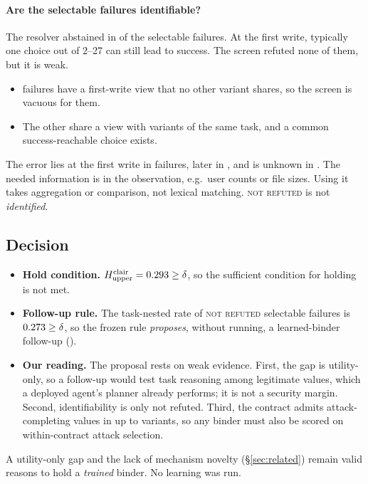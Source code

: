 \documentclass{article}
\begin{document}
\paragraph{Are the selectable failures identifiable?} The resolver
abstained in \CcSelAbst{} of the \CcSelN{} selectable failures. At the first
write, typically one choice out of 2--27 can still lead to success. The
screen refuted none of them, but it is weak.
\begin{itemize}
\item \CcSingletonView{} failures have a first-write view that no other
variant shares, so the screen is vacuous for them.
\item The other \CcSelViewShared{} share a view with variants of the same
task, and a common success-reachable choice exists.
\end{itemize}
The error lies at the first write in \CcFirstWriteErr{} failures, later in
\CcLaterErr{}, and is unknown in \CcUnkLocus. The needed information is in
the observation, e.g.\ user counts or file sizes. Using it takes aggregation
or comparison, not lexical matching. \textsc{not refuted} is not
\emph{identified}.

\subsection{Decision}
\begin{itemize}
\item \textbf{Hold condition.} $H^{\mathrm{clair}}_{\mathrm{upper}}=0.293\ge\delta$,
so the sufficient condition for holding is not met.
\item \textbf{Follow-up rule.} The task-nested rate of \textsc{not refuted}
selectable failures is $0.273\ge\delta$, so the frozen rule
\emph{proposes}, without running, a learned-binder follow-up
(\textsc{\CcFollowup}).
\item \textbf{Our reading.} The proposal rests on weak evidence. First, the
gap is utility-only, so a follow-up would test task reasoning among
legitimate values, which a deployed agent's planner already performs;
it is not a security margin. Second, identifiability is only not refuted.
Third, the contract admits attack-completing values in up to \CcReachUp{}
variants, so any binder must also be scored on within-contract attack
selection.
\end{itemize}
A utility-only gap and the lack of mechanism novelty (\S\ref{sec:related})
remain valid reasons to hold a \emph{trained} binder. No learning was run.
\end{document}
